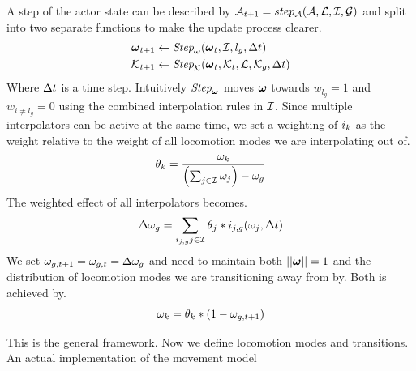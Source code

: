 A step of the actor state can be described by $\mathcal{A}_{t+1} = step_{\mathcal{A}}(\mathcal{A}, \mathcal{L}, \mathcal{I}, \mathcal{G})$ and split into two separate functions to make the update process clearer.
\begin{subequations}
\begin{align}
    \boldsymbol{\omega }_{t+1} &\leftarrow \textit{Step}_{\boldsymbol{\omega }}( \boldsymbol{\omega }_{t}, \mathcal{I}, l_g, \Delta{t}) \label{eq:step:interpolators}\\
    \mathcal{K}_{t+1} &\leftarrow  \textit{Step}_{\mathcal{K}}(\boldsymbol{\omega }_t, \mathcal{K}_{t},  \mathcal{L}, \mathcal{K}_{g}, \Delta{t} )\label{eq:step:kinematics}
\end{align}
\end{subequations}
Where $\Delta{t}$ is a time step. Intuitively $\textit{Step}_{\boldsymbol{\omega }}$ moves $\boldsymbol{\omega }$ towards $w_{l_{g}}=1$ and $w_{i\neq{l_g}}=0$ using the combined interpolation rules in $\mathcal{I}$. Since multiple interpolators can be active at the same time, we set a weighting of $i_k$ as the weight relative to the weight of all locomotion modes we are interpolating out of. 
\begin{equation}
\theta_{k}=\dfrac{\omega_k}{\left(\sum_{j\in\mathcal{I}}\omega_j\right)-\omega_g}
\end{equation}
The weighted effect of all interpolators becomes.
\begin{equation}
\Delta{ \omega }_g = \sum_{i_{j,g} j \in \mathcal{I}}\theta_j * i_{j,g}(\omega_j,\Delta{t})
\end{equation}
We set $\omega_{g,t+1}=\omega_{g,t}=\Delta{ \omega }_g$ and need to maintain both $||\boldsymbol{\omega }||=1$ and the distribution of locomotion modes we are transitioning away from by. Both is achieved by.
\begin{equation}
\omega_k = \theta_k * (1-\omega_{g,t+1})  
\end{equation}



This is the general framework. Now we define locomotion modes and transitions. An actual implementation of the movement model

